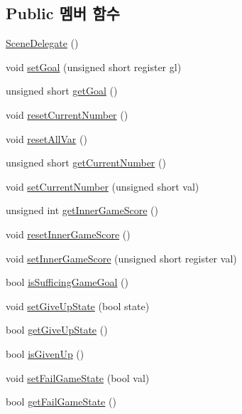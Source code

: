 \subsection*{Public 멤버 함수}
\begin{DoxyCompactItemize}
\item 
\hyperlink{classhsh_1_1_code_lady_j_j_y_1_1game2048_1_1_scene_delegate_afa15a8d40890d55355083d2edfe001e0}{Scene\+Delegate} ()
\item 
void \hyperlink{classhsh_1_1_code_lady_j_j_y_1_1game2048_1_1_scene_delegate_af6805111081144b68d039d8f71d1ed0b}{set\+Goal} (unsigned short register gl)
\item 
unsigned short \hyperlink{classhsh_1_1_code_lady_j_j_y_1_1game2048_1_1_scene_delegate_a5766c3d3f2f5ee3a4c7664198f362e8f}{get\+Goal} ()
\item 
void \hyperlink{classhsh_1_1_code_lady_j_j_y_1_1game2048_1_1_scene_delegate_acc4d5baa06662db5472e7bdee6758fd9}{reset\+Current\+Number} ()
\item 
void \hyperlink{classhsh_1_1_code_lady_j_j_y_1_1game2048_1_1_scene_delegate_a07cb2b429428f54e4291c4c8dc63b4ac}{reset\+All\+Var} ()
\item 
unsigned short \hyperlink{classhsh_1_1_code_lady_j_j_y_1_1game2048_1_1_scene_delegate_a3539fac6a923b081e0e3f195e467f3b7}{get\+Current\+Number} ()
\item 
void \hyperlink{classhsh_1_1_code_lady_j_j_y_1_1game2048_1_1_scene_delegate_a5a18f6b50e0a4d8b4a92b13e1fb3fd85}{set\+Current\+Number} (unsigned short val)
\item 
unsigned int \hyperlink{classhsh_1_1_code_lady_j_j_y_1_1game2048_1_1_scene_delegate_af8998199e13c71f6598b1d61159d7aa0}{get\+Inner\+Game\+Score} ()
\item 
void \hyperlink{classhsh_1_1_code_lady_j_j_y_1_1game2048_1_1_scene_delegate_a99d2b67eacb056791260fb451d29e60a}{reset\+Inner\+Game\+Score} ()
\item 
void \hyperlink{classhsh_1_1_code_lady_j_j_y_1_1game2048_1_1_scene_delegate_abd34ec6afe537cccfd469f2e1fc090fc}{set\+Inner\+Game\+Score} (unsigned short register val)
\item 
bool \hyperlink{classhsh_1_1_code_lady_j_j_y_1_1game2048_1_1_scene_delegate_a590a3df7299ee2118db8556d7d594460}{is\+Sufficing\+Game\+Goal} ()
\item 
void \hyperlink{classhsh_1_1_code_lady_j_j_y_1_1game2048_1_1_scene_delegate_a26d362200e9644c85f892e71592eef92}{set\+Give\+Up\+State} (bool state)
\item 
bool \hyperlink{classhsh_1_1_code_lady_j_j_y_1_1game2048_1_1_scene_delegate_abe91b73b30ea51884c07d50f4a9664f3}{get\+Give\+Up\+State} ()
\item 
bool \hyperlink{classhsh_1_1_code_lady_j_j_y_1_1game2048_1_1_scene_delegate_a66c164970bd5d826ca85deaeea30167b}{is\+Given\+Up} ()
\item 
void \hyperlink{classhsh_1_1_code_lady_j_j_y_1_1game2048_1_1_scene_delegate_adc205b068a4df3da173c37d4236a4e25}{set\+Fail\+Game\+State} (bool val)
\item 
bool \hyperlink{classhsh_1_1_code_lady_j_j_y_1_1game2048_1_1_scene_delegate_ab975ebc9c59b2e9da24e957a7bd2d2ac}{get\+Fail\+Game\+State} ()
\end{DoxyCompactItemize}
